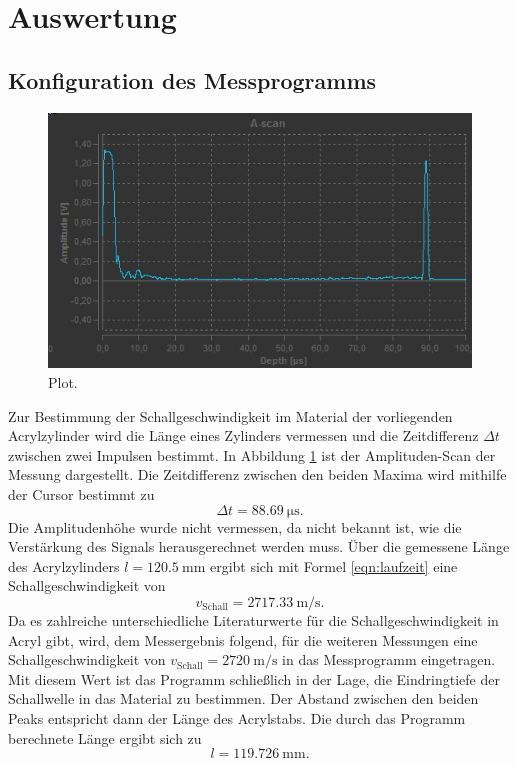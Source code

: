 \section{Auswertung}
\label{sec:Auswertung}

\subsection{Konfiguration des Messprogramms}
\begin{figure}
  \centering
  \includegraphics{Messdaten/a.jpg}
  \caption{Plot.}
  \label{fig:a1}
\end{figure}
Zur Bestimmung der Schallgeschwindigkeit im Material der vorliegenden Acrylzylinder wird die Länge eines Zylinders vermessen und die Zeitdifferenz $\Delta t$ zwischen zwei Impulsen bestimmt.
In Abbildung \ref{fig:a1} ist der Amplituden-Scan der Messung dargestellt.
Die Zeitdifferenz zwischen den beiden Maxima wird mithilfe der Cursor bestimmt zu
\begin{equation}
  \Delta t=\SI{88.69}{\micro\second} \text{.}
\end{equation}
Die Amplitudenhöhe wurde nicht vermessen, da nicht bekannt ist, wie die Verstärkung des Signals herausgerechnet werden muss.
Über die gemessene Länge des Acrylzylinders $l=\SI{120.5}{\milli\meter}$ ergibt sich mit Formel \eqref{eqn:laufzeit} eine Schallgeschwindigkeit von
\begin{equation}
  v_{\mathrm{Schall}}=\SI{2717.33}{\meter\per\second} \text{.}
\end{equation}
Da es zahlreiche unterschiedliche Literaturwerte für die Schallgeschwindigkeit in Acryl gibt, wird, dem Messergebnis folgend, für die weiteren Messungen eine Schallgeschwindigkeit von $v_{\mathrm{Schall}}=\SI{2720}{\meter\per\second}$ in das Messprogramm eingetragen.
Mit diesem Wert ist das Programm schließlich in der Lage, die Eindringtiefe der Schallwelle in das Material zu bestimmen.
Der Abstand zwischen den beiden Peaks entspricht dann der Länge des Acrylstabs.
Die durch das Programm berechnete Länge ergibt sich zu
\begin{equation}
  l=\SI{119.726}{\milli\meter} \text{.}
\end{equation}
\FloatBarrier

